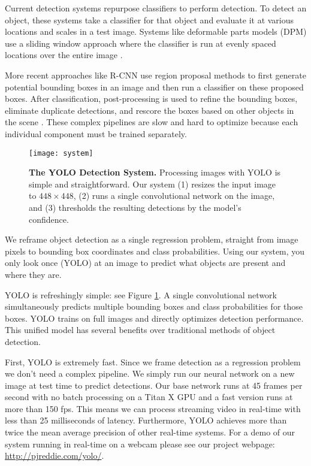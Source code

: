 Current detection systems repurpose classifiers to perform detection. To detect an object, these systems take a classifier for that object and evaluate it at various locations and scales in a test image. Systems like deformable parts models (DPM) use a sliding window approach where the classifier is run at evenly spaced locations over the entire image \cite{lsvm-pami}.

More recent approaches like R-CNN use region proposal methods to first generate potential bounding boxes in an image and then run a classifier on these proposed boxes. After classification, post-processing is used to refine the bounding boxes, eliminate duplicate detections, and rescore the boxes based on other objects in the scene \cite{girshick2014rich}. These complex pipelines are slow and hard to optimize because each individual component must be trained separately.

\begin{figure}[t]
\begin{center}
 \texttt{[image: system]}
\end{center}
 \caption{\small \textbf{The YOLO Detection System.} Processing images with YOLO is simple and straightforward. Our system (1) resizes the input image to $448 \times 448$, (2) runs a single convolutional network on the image, and (3) thresholds the resulting detections by the model's confidence.}
\label{system}
\end{figure}

We reframe object detection as a single regression problem, straight from image pixels to bounding box coordinates and class probabilities. Using our system, you only look once (YOLO) at an image to predict what objects are present and where they are.

YOLO is refreshingly simple: see Figure \ref{system}. A single convolutional network simultaneously predicts multiple bounding boxes and class probabilities for those boxes. YOLO trains on full images and directly optimizes detection performance. This unified model has several benefits over traditional methods of object detection.

First, YOLO is extremely fast. Since we frame detection as a regression problem we don't need a complex pipeline. We simply run our neural network on a new image at test time to predict detections. Our base network runs at 45 frames per second with no batch processing on a Titan X GPU and a fast version runs at more than 150 fps. This means we can process streaming video in real-time with less than 25 milliseconds of latency. Furthermore, YOLO achieves more than twice the mean average precision of other real-time systems. For a demo of our system running in real-time on a webcam please see our project webpage: \url{http://pjreddie.com/yolo/}.


